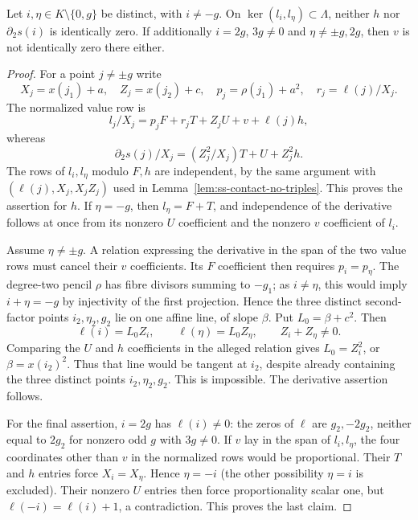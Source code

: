 \begin{lemma}
\label{lem:ss-third-value-linear-tests}
Let $i,\eta\in K\setminus\{0,g\}$ be distinct, with
$i\ne-g$. On $\ker(l_i,l_\eta)\subset\Lambda$, neither $h$ nor
$\partial_2s(i)$ is identically zero.
If additionally $i=2g$, $3g\ne0$ and $\eta\ne\pm g,2g$,
then $v$ is not identically zero there either.
\end{lemma}
\begin{proof}
For a point $j\ne\pm g$ write
\[
 X_j=x(j_1)+a,\quad Z_j=x(j_2)+c,\quad
 p_j=\rho(j_1)+a^2,\quad r_j=\ell(j)/X_j.
\]
The normalized value row is
\[
 l_j/X_j=p_jF+r_jT+Z_jU+v+\ell(j)h,
\]
whereas
\[
 \partial_2s(j)/X_j=(Z_j^2/X_j)T+U+Z_j^2h.
\]
The rows of $l_i,l_\eta$ modulo $F,h$ are independent, by the
same argument with $(\ell(j),X_j,X_jZ_j)$ used in
Lemma~\ref{lem:ss-contact-no-triples}. This proves the assertion
for $h$. If $\eta=-g$, then $l_\eta=F+T$, and independence of
the derivative follows at once from its nonzero $U$ coefficient
and the nonzero $v$ coefficient of $l_i$.

Assume $\eta\ne\pm g$. A relation expressing the derivative in
the span of the two value rows must cancel their $v$ coefficients.
Its $F$ coefficient then requires $p_i=p_\eta$.
The degree-two pencil $\rho$ has fibre divisors summing to $-g_1$;
as $i\ne\eta$, this would imply $i+\eta=-g$ by injectivity of
the first projection. Hence the three distinct second-factor points
$i_2,\eta_2,g_2$ lie on one affine line, of slope $\beta$.
Put $L_0=\beta+c^2$. Then
\[
 \ell(i)=L_0Z_i,\qquad \ell(\eta)=L_0Z_\eta,
 \qquad Z_i+Z_\eta\ne0.
\]
Comparing the $U$ and $h$ coefficients in the alleged relation
gives $L_0=Z_i^2$, or $\beta=x(i_2)^2$.
Thus that line would be tangent at $i_2$, despite already containing
the three distinct points $i_2,\eta_2,g_2$. This is impossible.
The derivative assertion follows.

For the final assertion, $i=2g$ has $\ell(i)\ne0$: the zeros of
$\ell$ are $g_2,-2g_2$, neither equal to $2g_2$ for nonzero odd
$g$ with $3g\ne0$. If $v$ lay in the span of $l_i,l_\eta$, the
four coordinates other than $v$ in the normalized rows would be
proportional. Their $T$ and $h$ entries force $X_i=X_\eta$.
Hence $\eta=-i$ (the other possibility $\eta=i$ is excluded).
Their nonzero $U$ entries then force proportionality scalar one,
but $\ell(-i)=\ell(i)+1$, a contradiction. This proves the last
claim.
\end{proof}

